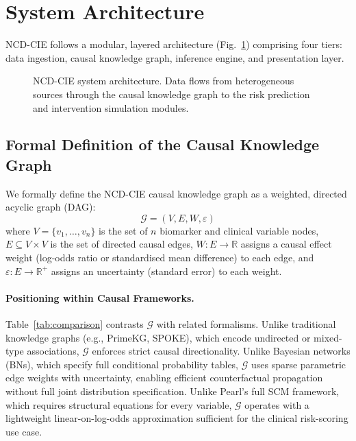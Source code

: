\documentclass[runningheads]{llncs}
\begin{document}
\section{System Architecture}\label{sec:arch}

NCD-CIE follows a modular, layered architecture (Fig.~\ref{fig:arch})
comprising four tiers: data ingestion, causal knowledge graph,
inference engine, and presentation layer.

\begin{figure}[t]
\centering
{}
\caption{NCD-CIE system architecture.  Data flows from heterogeneous
sources through the causal knowledge graph to the risk prediction and
intervention simulation modules.}\label{fig:arch}
\end{figure}

\subsection{Formal Definition of the Causal Knowledge Graph}
\label{sec:formal}

We formally define the NCD-CIE causal knowledge graph as a weighted,
directed acyclic graph (DAG):
\begin{equation}\label{eq:graph}
\mathcal{G} = (V, E, W, \varepsilon)
\end{equation}
where $V=\{v_1,\ldots,v_n\}$ is the set of $n$ biomarker and clinical
variable nodes, $E \subseteq V \times V$ is the set of directed causal
edges, $W: E \rightarrow \mathbb{R}$ assigns a causal effect weight
(log-odds ratio or standardised mean difference) to each edge, and
$\varepsilon: E \rightarrow \mathbb{R}^+$ assigns an uncertainty
(standard error) to each weight.

\paragraph{Positioning within Causal Frameworks.}
Table~\ref{tab:comparison} contrasts $\mathcal{G}$ with related
formalisms.  Unlike traditional knowledge graphs (e.g., PrimeKG,
SPOKE), which encode undirected or mixed-type associations,
$\mathcal{G}$ enforces strict causal directionality.  Unlike Bayesian
networks (BNs), which specify full conditional probability tables,
$\mathcal{G}$ uses sparse parametric edge weights with uncertainty,
enabling efficient counterfactual propagation without full joint
distribution specification.  Unlike Pearl's full SCM framework, which
requires structural equations for every variable, $\mathcal{G}$
operates with a lightweight linear-on-log-odds approximation
sufficient for the clinical risk-scoring use case.
\end{document}
